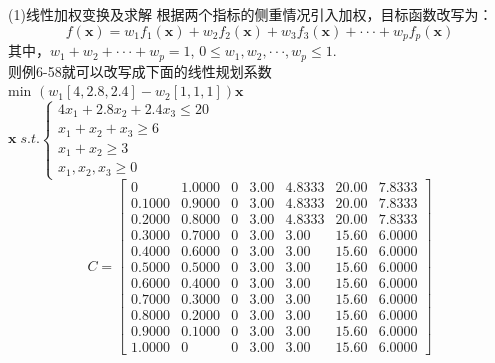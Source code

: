 \documentclass[10pt]{beamer}
\begin{document}
\begin{frame}[allowframebreaks]{(1)线性加权变换及求解}
    根据两个指标的侧重情况引入加权，目标函数改写为：
    $$f(\bm{x}) = w_1f_1(\bm{x})+ w_2f_2(\bm{x})+ w_3f_3(\bm{x})+\cdot \cdot \cdot+w_pf_p(\bm{x})$$
    其中，$w_1+w_2+\cdot \cdot \cdot+w_p=1$, $0\leq w_1,w_2,\cdot \cdot \cdot,w_p\leq 1$.	
    \\则例6-58就可以改写成下面的线性规划系数\\
    \qquad min\qquad \qquad \qquad \qquad \qquad
    $(w_1[4,2.8,2.4]-w_2[1,1,1])\bm{x}$
    \\
    $
    \bm{x}\;s.t.
    \left\{
    \begin{array}{ccc}
      4x_1+2.8x_2+2.4x_3\leq20\\
      x_1+x_2+x_3\geq6\\
      x_1+x_2\geq3 \\
      x_1,x_2,x_3\geq0 
    \end{array} 
    \right.
    $\\
    \begin{equation}
      C =
      \begin{bmatrix}
0&1.0000&0&3.00&4.8333&20.00&7.8333\\
0.1000&0.9000&0&3.00&4.8333&20.00&7.8333\\
0.2000&0.8000&0&3.00&4.8333&20.00&7.8333\\
0.3000&0.7000&0&3.00&3.00&15.60&6.0000\\
0.4000&0.6000&0&3.00&3.00&15.60&6.0000\\
0.5000&0.5000&0&3.00&3.00&15.60&6.0000\\
0.6000&0.4000&0&3.00&3.00&15.60&6.0000\\
0.7000&0.3000&0&3.00&3.00&15.60&6.0000\\
0.8000&0.2000&0&3.00&3.00&15.60&6.0000\\
0.9000&0.1000&0&3.00&3.00&15.60&6.0000\\
1.0000&0&0&3.00&3.00&15.60&6.0000
      \end{bmatrix}
    \end{equation}
  \end{frame}
  
\end{document}
